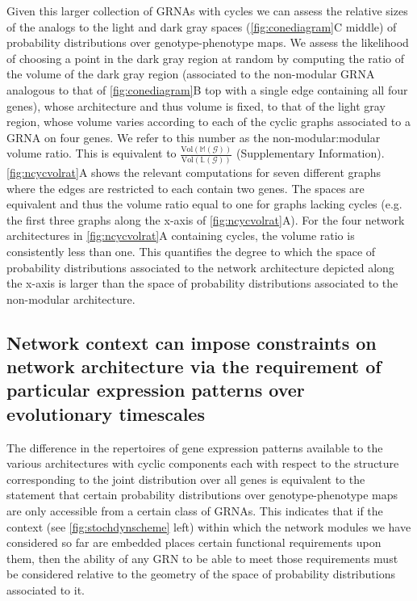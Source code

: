 Given this larger collection of GRNAs with cycles we can assess the relative sizes of the analogs to the light and dark gray spaces (\ref{fig:conediagram}C middle) of probability distributions over genotype-phenotype maps. We assess the likelihood of choosing a point in the dark gray region at random by computing the ratio of the volume of the dark gray region (associated to the non-modular GRNA analogous to that of \ref{fig:conediagram}B top with a single edge containing all four genes), whose architecture and thus volume is fixed, to that of the light gray region, whose volume varies according to each of the cyclic graphs associated to a GRNA on four genes. We refer to this number as the non-modular:modular volume ratio. This is equivalent to $\frac{\text{Vol}(\mathbb{M}(\mathcal{G}))}{\text{Vol}(\mathbb{L}(\mathcal{G}))}$ (Supplementary Information).\ref{fig:ncycvolrat}A shows the relevant computations for seven different graphs where the edges are restricted to each contain two genes. The spaces are equivalent and thus the volume ratio equal to one for graphs lacking cycles (e.g. the first three graphs along the x-axis of \ref{fig:ncycvolrat}A). For the four network architectures in \ref{fig:ncycvolrat}A containing cycles, the volume ratio is consistently less than one. This quantifies the degree to which the space of probability distributions associated to the network architecture depicted along the x-axis is larger than the space of probability distributions associated to the non-modular architecture.

\subsection{Network context can impose constraints on network architecture via the requirement of particular expression patterns over evolutionary timescales}

The difference in the repertoires of gene expression patterns available to the various architectures with cyclic components each with respect to the structure corresponding to the joint distribution over all genes is equivalent to the statement that certain probability distributions over genotype-phenotype maps are only accessible from a certain class of GRNAs. This indicates that if the context (see \ref{fig:stochdynscheme} left) within which the network modules we have considered so far are embedded places certain functional requirements upon them, then the ability of any GRN to be able to meet those requirements must be considered relative to the geometry of the space of probability distributions associated to it.

